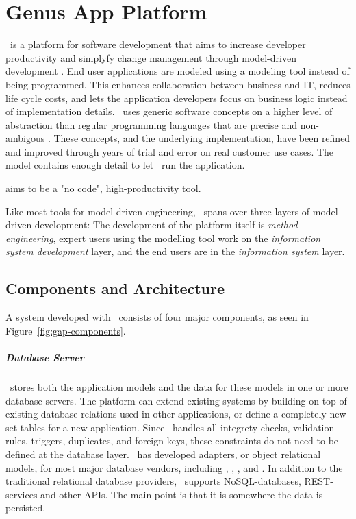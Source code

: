\chapter{Genus App Platform}
\label{chap:Genus App Platform}

\gap~is a platform for software development that aims to increase developer productivity and simplyfy change management through model-driven development \cite{Genus_AS2016-kt}. End user applications are modeled using a modeling tool instead of being programmed. This enhances collaboration between business and IT, reduces life cycle costs, and lets the application developers focus on business logic instead of implementation details. \gap~uses generic software concepts on a higher level of abstraction than regular programming languages that are precise and non-ambigous \cite{noauthor_undated-qy}. These concepts, and the underlying implementation, have been refined and improved through years of trial and error on real customer use cases. The model contains enough detail to let \gap~run the application.

\gap aims to be a "no code", high-productivity tool.

Like most tools for model-driven engineering, \gap~spans over three layers of model-driven development: The development of the platform itself is \textit{method engineering}, expert users using the modelling tool work on the \textit{information system development} layer, and the end users are in the \textit{information system} layer.


\section{Components and Architecture}
\label{sec:Components and Architecture}
A system developed with \gap~consists of four major components, as seen in Figure~\ref{fig:gap-components}.

\paragraph{Database Server}
\label{par:Database Server}
\gap~stores both the application models and the data for these models in one or more database servers. The platform can extend existing systems by building on top of existing database relations used in other applications, or define a completely new set tables for a new application. Since \gap~handles all integrety checks, validation rules, triggers, duplicates, and foreign keys, these constraints do not need to be defined at the database layer. \genus~has developed adapters, or object relational models, for most major database vendors, including , , , and . In addition to the traditional relational database providers, \gap~supports NoSQL-databases, REST-services and other APIs. The main point is that it is somewhere the data is persisted.

